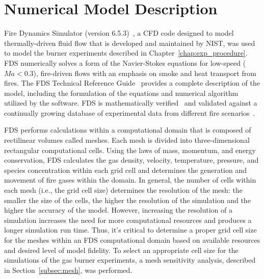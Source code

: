 
\renewcommand{\thechapter}{4}
\label{chap:model_descr}

\chapter{Numerical Model Description}
Fire Dynamics Simulator (version 6.5.3)~\cite{FDS_Users_Guide}, a CFD code designed to model thermally-driven fluid flow that is developed and maintained by NIST, was used to model the burner experiments described in Chapter~\ref{chap:exp_procedure}. FDS numerically solves a form of the Navier-Stokes equations for low-speed ($Ma < 0.3$), fire-driven flows with an emphasis on smoke and heat transport from fires. The FDS Technical Reference Guide~\cite{FDS_Tech_Guide} provides a complete description of the model, including the formulation of the equations and numerical algorithm utilized by the software. FDS is mathematically verified~\cite{FDS_Verification_Guide} and validated against a continually growing database of experimental data from different fire scenarios~\cite{FDS_Validation_Guide}. 

FDS performs calculations within a computational domain that is composed of rectilinear volumes called meshes. Each mesh is divided into three-dimensional rectangular computational cells. Using the laws of mass, momentum, and energy conservation, FDS calculates the gas density, velocity, temperature, pressure, and species concentration within each grid cell and determines the generation and movement of fire gases within the domain. In general, the number of cells within each mesh (i.e., the grid cell size) determines the resolution of the mesh: the smaller the size of the cells, the higher the resolution of the simulation and the higher the accuracy of the model. However, increasing the resolution of a simulation increases the need for more computational resources and produces a longer simulation run time. Thus, it's critical to determine a proper grid cell size for the meshes within an FDS computational domain based on available resources and desired level of model fidelity. To select an appropriate cell size for the simulations of the gas burner experiments, a mesh sensitivity analysis, described in Section~\ref{subsec:mesh}, was performed.  

